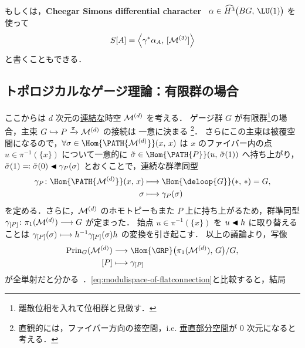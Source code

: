 \documentclass[TQFT_main]{subfiles}
\begin{document}
もしくは，\textbf{Cheegar Simons differential character}~\cite{Simons_2007} $\alpha \in \widehat{H^3} \bigl(BG,\, \LU(1)\bigr)$ を使って
\begin{align}
    S[A] = \expval{\gamma^* \alpha_A,\, [\mathcal{M}^{(3)}]}
\end{align}
と書くこともできる．

\subsection{トポロジカルなゲージ理論：有限群の場合}

ここからは $d$ 次元の\underline{連結な}時空 $\mathcal{M}^{(d)}$ を考える．
ゲージ群 $G$ が有限群\footnote{離散位相を入れて位相群と見做す．}の場合，主束 $G \hookrightarrow P \xrightarrow{\pi} \mathcal{M}^{(d)}$ の接続は
一意に決まる
\footnote{
    直観的には，ファイバー方向の接空間，i.e. \hyperref[def:connection]{垂直部分空間}が $0$ 次元になると考える．
}．
さらにこの主束は被覆空間になるので，$\forall \sigma \in \Hom{\PATH{\mfdcal{M}{d}}}(x,\, x)$ は $x$ のファイバー内の点 $u \in \pi^{-1}(\{x\})$ について一意的に $\tilde{\sigma} \in \Hom{\PATH{P}}(u,\, \tilde{\sigma}(1))$ へ持ち上がり，
$\tilde{\sigma}(1) \eqqcolon \tilde{\sigma}(0) \blacktriangleleft \gamma_P(\sigma)$ とおくことで，連続な群準同型
\begin{align}
    \gamma_P \colon \Hom{\PATH{\mfdcal{M}{d}}} (x,\, x) &\lmto \Hom{\deloop{G}} (*,\, *) = G, \\
    \sigma &\lmto \gamma_P(\sigma)
\end{align}
を定める．さらに，$\mathcal{M}^{(d)}$ のホモトピーもまた $P$ 上に持ち上がるため，群準同型 $\gamma_{[P]} \colon \pi_1(\mathcal{M}^{(d)}) \longrightarrow G$ が定まった．
始点 $u \in \pi^{-1}(\{x\})$ を $u \blacktriangleleft h$ に取り替えることは $\gamma_{[P]}(\sigma) \longmapsto h^{-1} \gamma_{[P]}(\sigma) h$ の変換を引き起こす．
以上の議論より，写像
\begin{align}
    \mathrm{Prin}_G(\mfdcal{M}{d}) &\lto \Hom{\GRP}\bigl( \pi_1(\mfdcal{M}{d}),\, G \bigr) / G, \\
    [P] &\lmto \gamma_{[P]}
\end{align}
が全単射だと分かる~\cite[p.4]{Freed_1993}．\eqref{eq:modulispace-of-flatconnection}と比較すると，結局
\end{document}
